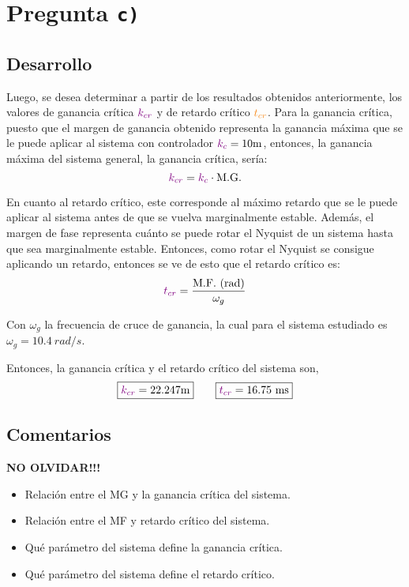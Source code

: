 \section{Pregunta \texttt{c)}}\label{pregunta-c}

\subsection{Desarrollo}

Luego, se desea determinar a partir de los resultados obtenidos anteriormente,
los valores de ganancia crítica $\mathbin{\color{violet}k_{cr}}$ y de retardo crítico $\nara{t_{cr}}$.
Para la ganancia crítica, puesto que el margen de ganancia obtenido representa
la ganancia máxima que se le puede aplicar al sistema con controlador $\mora{k_{c}} = 10\unit{m}$,
entonces, la ganancia máxima del sistema general, la ganancia crítica, sería:
\begin{equation}
  \mathbin{\color{violet}k_{cr}} = \mathbin{\color{violet}k_{c}} \cdot \text{M.G.}
\end{equation}

En cuanto al retardo crítico, este corresponde al máximo retardo que se le
puede aplicar al sistema antes de que se vuelva marginalmente estable. Además,
el margen de fase representa cuánto se puede rotar el Nyquist de un sistema
hasta que sea marginalmente estable. Entonces, como rotar el Nyquist se consigue
aplicando un retardo, entonces se ve de esto que el retardo crítico es:
\begin{equation}
  \mora{t_{cr}} = \frac{\te{M.F.}\ \te{(rad)}}{\omega_{g}}
\end{equation}

Con $\omega_{g}$ la frecuencia de cruce de ganancia, la cual para el sistema
estudiado es $\omega_{g} = 10.4\ \unit{rad/s}$.

Entonces, la ganancia crítica y el retardo crítico del sistema son,
\begin{equation}
  \boxed{\mora{k_{cr}} = 22.247\unit{m}} \qquad \boxed{\mora{t_{cr}} = 16.75\ \unit{ms}}
\end{equation}


\FloatBarrier
\subsection{Comentarios}

\textbf{NO OLVIDAR!!!}


\begin{itemize}
  \item Relación entre el MG y la ganancia crítica del sistema.
  \item Relación entre el MF y retardo crítico del sistema.
  \item Qué parámetro del sistema define la ganancia crítica.
  \item Qué parámetro del sistema define el retardo crítico.
\end{itemize}
